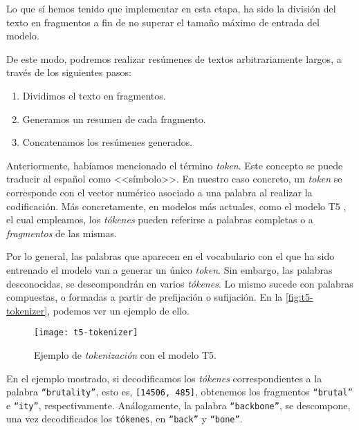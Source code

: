 Lo que sí hemos tenido que implementar en esta etapa, ha sido la división del texto en fragmentos a fin de no superar el tamaño máximo de entrada del modelo.

De este modo, podremos realizar resúmenes de textos arbitrariamente largos, a través de los siguientes pasos:

\vspace{-\baselineskip}
\begin{enumerate}
	\tightlist
	\item Dividimos el texto en fragmentos.
	\item Generamos un resumen de cada fragmento.
	\item Concatenamos los resúmenes generados.
\end{enumerate}
\vspace{-0.3cm}

Anteriormente, habíamos mencionado el término \emph{token}. Este concepto se puede traducir al español como <<símbolo>>. En nuestro caso concreto, un \emph{token} se corresponde con el vector numérico asociado a una palabra al realizar la codificación. Más concretamente, en modelos más actuales, como el modelo T5 \cite{raffel19}, el cual empleamos, los \emph{tókenes} pueden referirse a palabras completas o a \emph{fragmentos} de las mismas.

Por lo general, las palabras que aparecen en el vocabulario con el que ha sido entrenado el modelo van a generar un único \emph{token}. Sin embargo, las palabras desconocidas, se descompondrán en varios \emph{tókenes}. Lo mismo sucede con palabras compuestas, o formadas a partir de prefijación o sufijación. En la \autoref{fig:t5-tokenizer}, podemos ver un ejemplo de ello.

\newpage

\begin{figure}[h]
	\centering
	\texttt{[image: t5-tokenizer]}
	\caption{Ejemplo de \emph{tokenización} con el modelo T5.}
	\label{fig:t5-tokenizer}
\end{figure}

\vspace{-0.5cm}
En el ejemplo mostrado, si decodificamos los \emph{tókenes} correspondientes a la palabra \texttt{``brutality''}, esto es, \texttt{[14506, 485]}, obtenemos los fragmentos \texttt{``brutal''} e \texttt{``ity''}, respectivamente. Análogamente, la palabra \texttt{``backbone''}, se descompone, una vez decodificados los \texttt{tókenes}, en \texttt{``back''} y \texttt{``bone''}.

